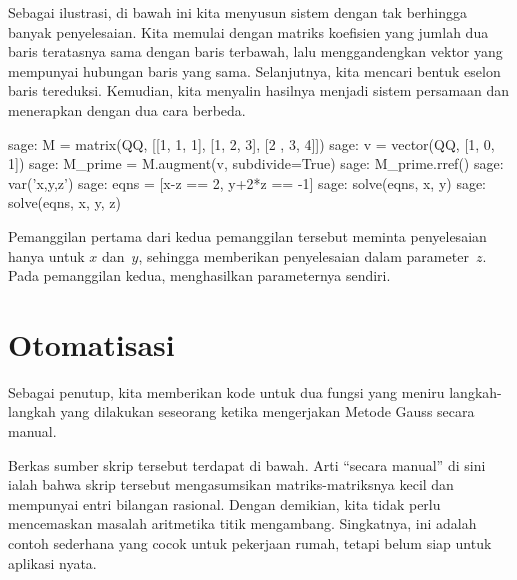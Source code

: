 Sebagai ilustrasi, di bawah ini kita menyusun
sistem dengan tak berhingga banyak penyelesaian.
Kita memulai dengan matriks koefisien
yang jumlah dua baris teratasnya sama dengan baris terbawah,
lalu menggandengkan vektor yang mempunyai hubungan baris yang sama. 
Selanjutnya, kita mencari bentuk eselon baris tereduksi.
Kemudian, kita menyalin hasilnya menjadi sistem persamaan dan menerapkan
 dengan dua cara berbeda.
\begin{sagecommandline}
sage: M = matrix(QQ, [[1, 1, 1], [1, 2, 3], [2 , 3, 4]])    
sage: v = vector(QQ, [1, 0, 1])                            
sage: M_prime = M.augment(v, subdivide=True)               
sage: M_prime.rref()
sage: var('x,y,z')          
sage: eqns = [x-z == 2, y+2*z == -1]
sage: solve(eqns, x, y)   
sage: solve(eqns, x, y, z)                                 
\end{sagecommandline}
Pemanggilan pertama dari kedua pemanggilan  tersebut
meminta penyelesaian hanya untuk $x$ dan~$y$, sehingga \Sage{} memberikan
penyelesaian dalam parameter~$z$.
Pada pemanggilan kedua, \Sage{} menghasilkan parameternya sendiri.   




\section{Otomatisasi}

Sebagai penutup, kita memberikan kode \python{} untuk dua fungsi
yang meniru langkah-langkah yang dilakukan seseorang ketika
mengerjakan Metode Gauss secara manual.

Berkas sumber skrip tersebut terdapat di bawah. 
Arti ``secara manual'' di sini ialah bahwa skrip tersebut
mengasumsikan matriks-matriksnya kecil dan mempunyai entri bilangan rasional.
Dengan demikian, kita tidak perlu mencemaskan masalah aritmetika titik mengambang.
Singkatnya, ini adalah contoh sederhana yang
cocok untuk pekerjaan rumah, tetapi belum siap untuk aplikasi nyata.


